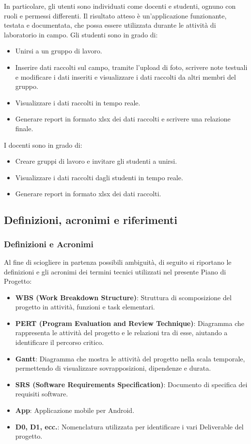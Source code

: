 In particolare, gli utenti sono individuati come docenti e studenti, ognuno con ruoli e permessi differenti. Il risultato atteso è un'applicazione funzionante, testata e documentata, che possa essere utilizzata durante le attività di laboratorio in campo.
Gli studenti sono in grado di:
\begin{itemize}
    \item Unirsi a un gruppo di lavoro.
    \item Inserire dati raccolti sul campo, tramite l'upload di foto, scrivere note testuali e modificare i dati inseriti e visualizzare i dati raccolti da altri membri del gruppo.
    \item Visualizzare i dati raccolti in tempo reale.
    \item Generare report in formato xlsx dei dati raccolti e scrivere una relazione finale.
\end{itemize}


I docenti sono in grado di:
\begin{itemize}
    \item Creare gruppi di lavoro e invitare gli studenti a unirsi.
    \item Visualizzare i dati raccolti dagli studenti in tempo reale.
    \item Generare report in formato xlsx dei dati raccolti.

\end{itemize}

\subsection{Definizioni, acronimi e riferimenti}

\subsubsection*{Definizioni e Acronimi}
Al fine di sciogliere in partenza possibili ambiguità, di seguito si riportano le definizioni e gli acronimi dei termini tecnici utilizzati nel presente Piano di Progetto:

\begin{itemize}
    \item \textbf{WBS (Work Breakdown Structure)}: Struttura di scomposizione del progetto in attività, funzioni e task elementari.
    \item \textbf{PERT (Program Evaluation and Review Technique)}: Diagramma che rappresenta le attività del progetto e le relazioni tra di esse, aiutando a identificare il percorso critico.
    \item \textbf{Gantt}: Diagramma che mostra le attività del progetto nella scala temporale, permettendo di visualizzare sovrapposizioni, dipendenze e durata.
    \item \textbf{SRS (Software Requirements Specification)}: Documento di specifica dei requisiti software.
    \item \textbf{App}: Applicazione mobile per Android.
    \item \textbf{D0, D1, ecc.}: Nomenclatura utilizzata per identificare i vari Deliverable del progetto.
\end{itemize}

